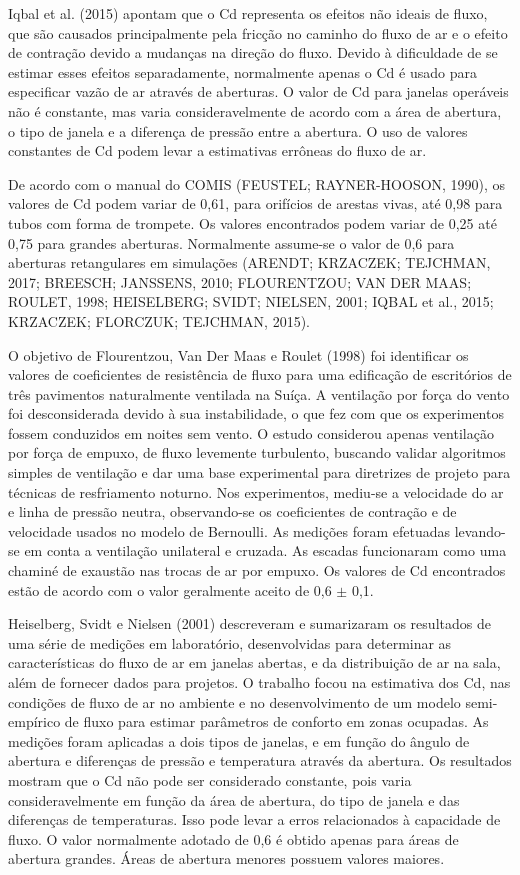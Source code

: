 \documentclass[brazil,hardcopy,openany,a5paper]{ufscthesis}
\begin{document}
	Iqbal et al. (2015) apontam que o Cd representa os efeitos não ideais de fluxo, que são causados principalmente pela fricção no caminho do fluxo de ar e o efeito de contração devido a mudanças na direção do fluxo. Devido à dificuldade de se estimar esses efeitos separadamente, normalmente apenas o Cd é usado para especificar vazão de ar através de aberturas. O valor de Cd para janelas operáveis não é constante, mas varia consideravelmente de acordo com a área de abertura, o tipo de janela e a diferença de pressão entre a abertura. O uso de valores constantes de Cd podem levar a estimativas errôneas do fluxo de ar.

	De acordo com o manual do COMIS (FEUSTEL; RAYNER-HOOSON, 1990), os valores de Cd podem variar de 0,61, para orifícios de arestas vivas,	até 0,98 para tubos com forma de trompete. Os valores encontrados podem variar de 0,25 até 0,75 para grandes aberturas. Normalmente assume-se o valor de 0,6 para aberturas retangulares em simulações (ARENDT; KRZACZEK; TEJCHMAN, 2017; BREESCH; JANSSENS, 2010; FLOURENTZOU; VAN DER MAAS; ROULET, 1998; HEISELBERG; SVIDT; NIELSEN, 2001; IQBAL et al., 2015; KRZACZEK; FLORCZUK; TEJCHMAN, 2015).

	O objetivo de Flourentzou, Van Der Maas e Roulet (1998) foi identificar os valores de coeficientes de resistência de fluxo para uma edificação de escritórios de três pavimentos naturalmente ventilada na Suíça. A ventilação por força do vento foi desconsiderada devido à sua instabilidade, o que fez com que os experimentos fossem conduzidos em noites sem vento. O estudo considerou apenas ventilação por força de empuxo, de fluxo levemente turbulento, buscando validar algoritmos simples de ventilação e dar uma base experimental para diretrizes de projeto para técnicas de resfriamento noturno. Nos experimentos, mediu-se a velocidade do ar e linha de pressão neutra, observando-se os coeficientes de contração e de velocidade usados no modelo de Bernoulli. As medições foram efetuadas levando-se em conta a ventilação unilateral e cruzada. As escadas funcionaram como uma chaminé de exaustão nas trocas de ar por empuxo. Os valores de Cd encontrados estão de acordo com o valor geralmente aceito de 0,6 ${\pm}$ 0,1.

	Heiselberg, Svidt e Nielsen (2001) descreveram e sumarizaram os resultados de uma série de medições em laboratório, desenvolvidas para determinar as características do fluxo de ar em janelas abertas, e da distribuição de ar na sala, além de fornecer dados para projetos. O trabalho focou na estimativa dos Cd, nas condições de fluxo de ar no ambiente e no desenvolvimento de um modelo semi-empírico de fluxo para estimar parâmetros de conforto em zonas ocupadas. As medições foram aplicadas a dois tipos de janelas, e em função do ângulo de abertura e diferenças de pressão e temperatura através da abertura. Os resultados mostram que o Cd não pode ser considerado constante, pois varia consideravelmente em função da área de abertura, do tipo de janela e das diferenças de temperaturas. Isso pode levar a erros relacionados à capacidade de fluxo. O valor normalmente adotado de 0,6 é obtido apenas para áreas de abertura grandes. Áreas de abertura menores possuem valores maiores.
\end{document}
